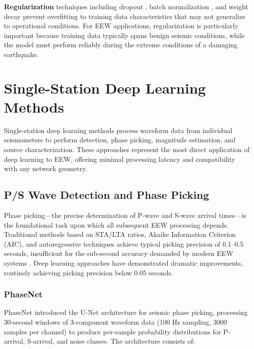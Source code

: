 \documentclass[review,authoryear]{elsarticle}
\begin{document}
\textbf{Regularization} techniques including dropout \citep{srivastava2014dropout}, batch normalization \citep{ioffe2015batch}, and weight decay prevent overfitting to training data characteristics that may not generalize to operational conditions. For EEW applications, regularization is particularly important because training data typically spans benign seismic conditions, while the model must perform reliably during the extreme conditions of a damaging earthquake.


\section{Single-Station Deep Learning Methods}
\label{sec:single_station}

Single-station deep learning methods process waveform data from individual seismometers to perform detection, phase picking, magnitude estimation, and source characterization. These approaches represent the most direct application of deep learning to EEW, offering minimal processing latency and compatibility with any network geometry.

\subsection{P/S Wave Detection and Phase Picking}

Phase picking---the precise determination of P-wave and S-wave arrival times---is the foundational task upon which all subsequent EEW processing depends. Traditional methods based on STA/LTA ratios, Akaike Information Criterion (AIC), and autoregressive techniques achieve typical picking precision of 0.1--0.5 seconds, insufficient for the sub-second accuracy demanded by modern EEW systems \citep{withers1998comparison}. Deep learning approaches have demonstrated dramatic improvements, routinely achieving picking precision below 0.05 seconds.

\subsubsection{PhaseNet}

PhaseNet \citep{zhu2019phasenet} introduced the U-Net architecture for seismic phase picking, processing 30-second windows of 3-component waveform data (100 Hz sampling, 3000 samples per channel) to produce per-sample probability distributions for P-arrival, S-arrival, and noise classes. The architecture consists of:
\end{document}
